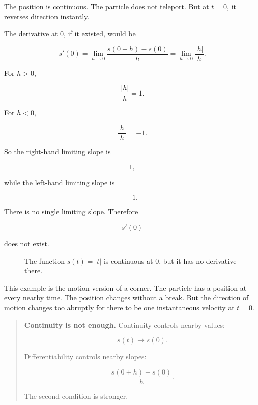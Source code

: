 The position is continuous.  The particle does not teleport.  But at \(t=0\), it reverses direction instantly.

The derivative at \(0\), if it existed, would be

\[
s'(0)
=
\lim_{h\to0}\frac{s(0+h)-s(0)}{h}
=
\lim_{h\to0}\frac{|h|}{h}.
\]

For \(h>0\),

\[
\frac{|h|}{h}=1.
\]

For \(h<0\),

\[
\frac{|h|}{h}=-1.
\]

So the right-hand limiting slope is

\[
1,
\]

while the left-hand limiting slope is

\[
-1.
\]

There is no single limiting slope.  Therefore

\[
s'(0)
\]

does not exist.

\begin{figure}[h]
\centering
{}
\caption{The function \(s(t)=|t|\) is continuous at \(0\), but it has no derivative there.}
\label{fig:absolute-value-motion-warning}
\end{figure}

This example is the motion version of a corner.  The particle has a position at every nearby time.  The position changes without a break.  But the direction of motion changes too abruptly for there to be one instantaneous velocity at \(t=0\).

\begin{quote}
\textbf{Continuity is not enough.}
Continuity controls nearby values:

\[
s(t)\to s(0).
\]

Differentiability controls nearby slopes:

\[
\frac{s(0+h)-s(0)}{h}.
\]

The second condition is stronger.
\end{quote}

